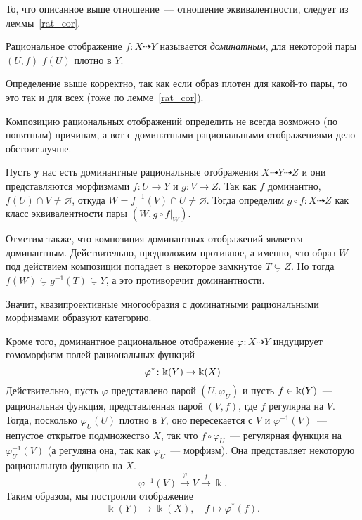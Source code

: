 	\begin{remark}
		То, что описанное выше отношение~--- отношение эквивалентности, следует из леммы~\ref{rat_cor}. 
	\end{remark}

	\begin{definition} 
		Рациональное отображение $f\colon X \dashrightarrow Y$ называется \emph{доминатным}, для некоторой пары $(U, f)$ $f(U)$ плотно в $Y$. 
	\end{definition}

	\begin{remark}
		Определение выше корректно, так как если образ плотен для какой-то пары, то это так и для всех (тоже по лемме~\ref{rat_cor}). 
	\end{remark}

	
	Композицию рациональных отображений определить не всегда возможно (по понятным) причинам, а вот с доминатными рациональными отображениями дело обстоит лучше. 
	
	Пусть у нас есть доминантные рациональные отображения $X \dashrightarrow Y \dashrightarrow Z$ и они представляются морфизмами $f\colon U \to Y$ и $g\colon V \to Z$. Так как $f$ доминантно, $f(U) \cap V \neq \varnothing$, откуда $W = f^{-1}(V) \cap U \neq \varnothing$. Тогда определим $g \circ f \colon X \dashrightarrow Z$ как класс эквивалентности пары $(W, g \circ f\vert_{W})$. 

	 Отметим также, что композиция доминантных отображений является доминантным. Действительно, предположим противное, а именно, что образ $W$ под действием композиции попадает в некоторое замкнутое $T \subsetneq Z$. Но тогда $f(W) \subsetneq g^{-1}(T) \subsetneq Y$, а это противоречит доминантности. 

	 Значит, квазипроективные многообразия с доминатными рациональными морфизмами образуют категорию. 

	Кроме того, доминантное рациональное отображение $\varphi\colon X \dashrightarrow Y$ индуцирует гомоморфизм полей рациональных функций 
	\[
		\varphi^*\colon \Bbbk(Y) \to \Bbbk(X) 
	\]
    Действительно, пусть $\varphi$ представлено парой $(U, \varphi_U)$ и пусть $f \in \Bbbk(Y)$~--- рациональная функция, представленная парой $(V, f)$, где $f$ регулярна на $V$. Тогда, посколько $\varphi_U(U)$ плотно в $Y$, оно пересекается с $V$ и $\varphi^{-1}(V)$~--- непустое открытое подмножество $X$, так что $f \circ \varphi_U$~--- регулярная функция на $\varphi_{U}^{-1}(V)$ (а регуляна она, так как $\varphi_U$~--- морфизм). Она представляет некоторую рациональную функцию на $X$. 
	 \[
	 	\varphi^{-1}(V) \xrightarrow{\varphi} V \xrightarrow{f} \Bbbk.
	 \]
	 Таким образом, мы построили отображение  
	 \[
	 	\Bbbk(Y) \to \Bbbk(X), \quad f \mapsto \varphi^{*}(f).
	 \] 

